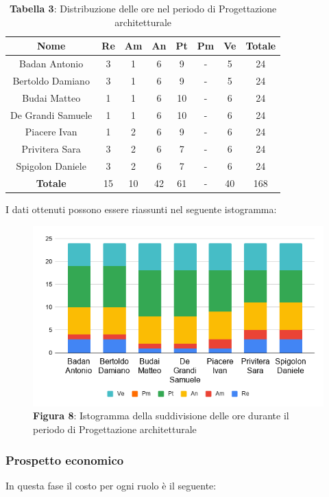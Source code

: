 \begin{table}[H]
	\centering
	\renewcommand{\arraystretch}{1.5}
	\begin{tabular}{|c|c|c|c|c|c|c|c|}
		\hline
		\rowcolor{lighter-grayer}
Nome & Re & Am & An & Pt & Pm & Ve & Totale \\ \hline
Badan Antonio & 3 & 1 & 6 & 9 & - & 5 & 24 \\ \hline
Bertoldo Damiano & 3 & 1 & 6 & 9 & - & 5 & 24 \\ \hline
Budai Matteo & 1 & 1 & 6 & 10 & - & 6 & 24 \\ \hline
De Grandi Samuele & 1 & 1 & 6 & 10 & - & 6 & 24 \\ \hline
Piacere Ivan & 1 & 2 & 6 & 9 & - & 6 & 24 \\ \hline
Privitera Sara & 3 & 2 & 6 & 7 & - & 6 & 24 \\ \hline
Spigolon Daniele & 3 & 2 & 6 & 7 & - & 6 & 24 \\ \hline
\textbf{Totale} & 15 & 10 & 42 & 61 & - & 40 & 168 \\ \hline
	\end{tabular}
	\caption*{\textbf{Tabella 3}: Distribuzione delle ore nel periodo di Progettazione architetturale\\}
\end{table}	
I dati ottenuti possono essere riassunti nel seguente istogramma:

\begin{figure}[H]
	\centering
	\includegraphics[width=0.7\linewidth]{res/images/IstogrammaFase2.png}
	\caption*{\textbf{Figura 8}: Istogramma della suddivisione delle ore durante il periodo di Progettazione architetturale}
	\label{fig:Figura10}
\end{figure}


\subsubsection{Prospetto economico}
In questa fase il costo per ogni ruolo è il seguente:

